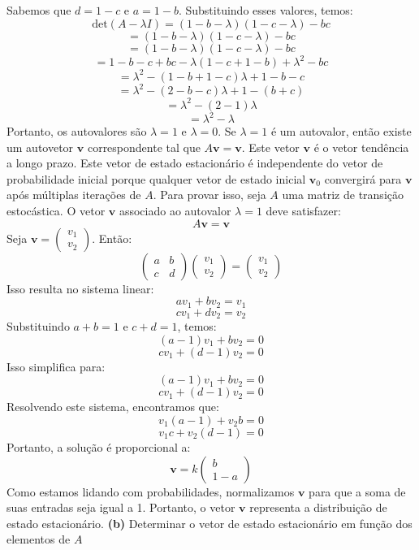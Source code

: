 {{{Sabemos que \(d = 1 - c\) e \(a = 1 - b\). Substituindo esses valores, temos:
\[ \text{det}(A - \lambda I) = (1 - b - \lambda)(1 - c - \lambda) - bc \]
\[ = (1 - b - \lambda)(1 - c - \lambda) - bc \]
\[ = (1 - b - \lambda)(1 - c - \lambda) - bc \]
\[ = 1 - b - c + bc - \lambda(1 - c + 1 - b) + \lambda^2 - bc \]
\[ = \lambda^2 - (1 - b + 1 - c)\lambda + 1 - b - c \]
\[ = \lambda^2 - (2 - b - c)\lambda + 1 - (b + c) \]
\[ = \lambda^2 - (2 - 1)\lambda \]
\[ = \lambda^2 - \lambda \]
Portanto, os autovalores são \(\lambda = 1\) e \(\lambda = 0\).
Se \(\lambda = 1\) é um autovalor, então existe um autovetor \(\mathbf{v}\) correspondente tal que \(A\mathbf{v} = \mathbf{v}\). Este vetor \(\mathbf{v}\) é o vetor tendência a longo prazo. Este vetor de estado estacionário é independente do vetor de probabilidade inicial porque qualquer vetor de estado inicial \( \mathbf{v}_0 \) convergirá para \(\mathbf{v}\) após múltiplas iterações de \(A\).
Para provar isso, seja \(A\) uma matriz de transição estocástica. O vetor \(\mathbf{v}\) associado ao autovalor \(\lambda = 1\) deve satisfazer:
\[ A \mathbf{v} = \mathbf{v} \]
Seja \(\mathbf{v} = \begin{pmatrix} v_1 \\ v_2 \end{pmatrix}\). Então:
\[ \begin{pmatrix}
a & b \\
c & d
\end{pmatrix} \begin{pmatrix} v_1 \\ v_2 \end{pmatrix} = \begin{pmatrix} v_1 \\ v_2 \end{pmatrix} \]
Isso resulta no sistema linear:
\[ av_1 + bv_2 = v_1 \]
\[ cv_1 + dv_2 = v_2 \]
Substituindo \(a + b = 1\) e \(c + d = 1\), temos:
\[ (a - 1)v_1 + bv_2 = 0 \]
\[ cv_1 + (d - 1)v_2 = 0 \]
Isso simplifica para:
\[ (a - 1)v_1 + bv_2 = 0 \]
\[ cv_1 + (d - 1)v_2 = 0 \]
Resolvendo este sistema, encontramos que:
\[ v_1 (a - 1) + v_2 b = 0 \]
\[ v_1 c + v_2 (d - 1) = 0 \]
Portanto, a solução é proporcional a:
\[ \mathbf{v} = k \begin{pmatrix} b \\ 1 - a \end{pmatrix} \]
Como estamos lidando com probabilidades, normalizamos \(\mathbf{v}\) para que a soma de suas entradas seja igual a 1. Portanto, o vetor \(\mathbf{v}\) representa a distribuição de estado estacionário.
\textbf{(b)} Determinar o vetor de estado estacionário em função dos elementos de \(A\)
}}}
